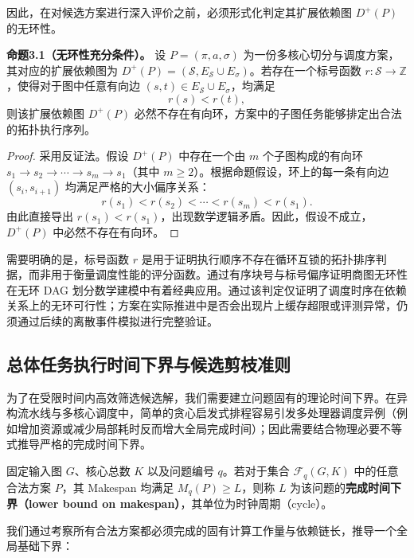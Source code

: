 \documentclass[anonymous,notoc]{gmcm2026}
\begin{document}
因此，在对候选方案进行深入评价之前，必须形式化判定其扩展依赖图 \(D^+(P)\) 的无环性。

\textbf{命题3.1（无环性充分条件）。} 设 \(P = (\pi, a, \sigma)\) 为一份多核心切分与调度方案，其对应的扩展依赖图为 \(D^+(P) = (\mathcal{S}, E_{\mathcal{S}} \cup E_\sigma)\)。若存在一个标号函数 \(r: \mathcal{S} \to \mathbb{Z}\)，使得对于图中任意有向边 \((s, t) \in E_{\mathcal{S}} \cup E_\sigma\)，均满足 \begin{equation}
r(s) < r(t),
\end{equation} 则该扩展依赖图 \(D^+(P)\) 必然不存在有向环，方案中的子图任务能够排定出合法的拓扑执行序列。

\begin{proof} 采用反证法。假设 \(D^+(P)\) 中存在一个由 \(m\) 个子图构成的有向环 \(s_1 \to s_2 \to \cdots \to s_m \to s_1\)（其中 \(m \ge 2\)）。根据命题假设，环上的每一条有向边 \((s_i, s_{i+1})\) 均满足严格的大小偏序关系： \begin{equation}
r(s_1) < r(s_2) < \cdots < r(s_m) < r(s_1).
\end{equation} 由此直接导出 \(r(s_1) < r(s_1)\)，出现数学逻辑矛盾。因此，假设不成立，\(D^+(P)\) 中必然不存在有向环。 \end{proof}

需要明确的是，标号函数 \(r\) 是用于证明执行顺序不存在循环互锁的拓扑排序判据，而非用于衡量调度性能的评分函数。通过有序块号与标号偏序证明商图无环性在无环 DAG 划分数学建模中有着经典应用\cite{ref7}。通过该判定仅证明了调度时序在依赖关系上的无环可行性；方案在实际推进中是否会出现片上缓存超限或评测异常，仍须通过后续的离散事件模拟进行完整验证。

\subsection{总体任务执行时间下界与候选剪枝准则}

为了在受限时间内高效筛选候选解，我们需要建立问题固有的理论时间下界。在异构流水线与多核心调度中，简单的贪心启发式排程容易引发多处理器调度异例（例如增加资源或减少局部耗时反而增大全局完成时间）\cite{ref2}；因此需要结合物理必要不等式推导严格的完成时间下界。

固定输入图 \(G\)、核心总数 \(K\) 以及问题编号 \(q\)。若对于集合 \(\mathcal{F}_q(G, K)\) 中的任意合法方案 \(P\)，其 Makespan 均满足 \(M_q(P) \ge L\)，则称 \(L\) 为该问题的\textbf{完成时间下界（lower bound on makespan）}，其单位为时钟周期（cycle）。

我们通过考察所有合法方案都必须完成的固有计算工作量与依赖链长，推导一个全局基础下界：
\end{document}
